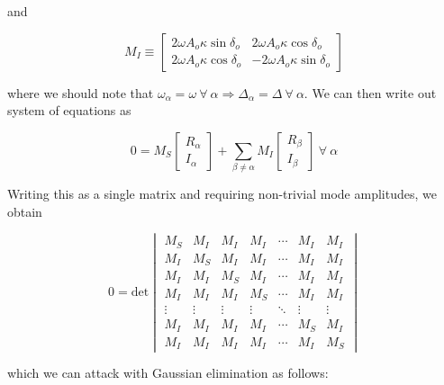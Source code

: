 and 

\begin{equation}
M_I \equiv
\begin{bmatrix}
2\omega A_o \kappa\sin\delta_o & 2\omega A_o \kappa\cos\delta_o \\
2\omega A_o \kappa\cos\delta_o & -2\omega A_o \kappa\sin\delta_o
\end{bmatrix}
\end{equation}

where we should note that $\omega_\alpha = \omega\ \forall\ \alpha \Rightarrow \Delta_\alpha = \Delta\ \forall\ \alpha$. We can then write out system of equations as 

\begin{equation}
0 = M_S \begin{bmatrix} R_\alpha \\ I_\alpha\end{bmatrix} + \sum_{\beta\neq\alpha} M_I \begin{bmatrix} R_\beta \\ I_\beta \end{bmatrix} \ \forall \ \alpha
\end{equation}

Writing this as a single matrix and requiring non-trivial mode amplitudes, we obtain

\begin{equation}
0=\mathrm{det}
\begin{vmatrix}
M_S & M_I & M_I & M_I & \cdots & M_I & M_I \\
M_I & M_S & M_I & M_I & \cdots & M_I & M_I \\
M_I & M_I & M_S & M_I & \cdots & M_I & M_I \\
M_I & M_I & M_I & M_S & \cdots & M_I & M_I \\
\vdots & \vdots & \vdots & \vdots & \ddots & \vdots & \vdots \\
M_I & M_I & M_I & M_I & \cdots & M_S & M_I \\
M_I & M_I & M_I & M_I & \cdots & M_I & M_S 
\end{vmatrix}
\end{equation}

which we can attack with Gaussian elimination as follows:

